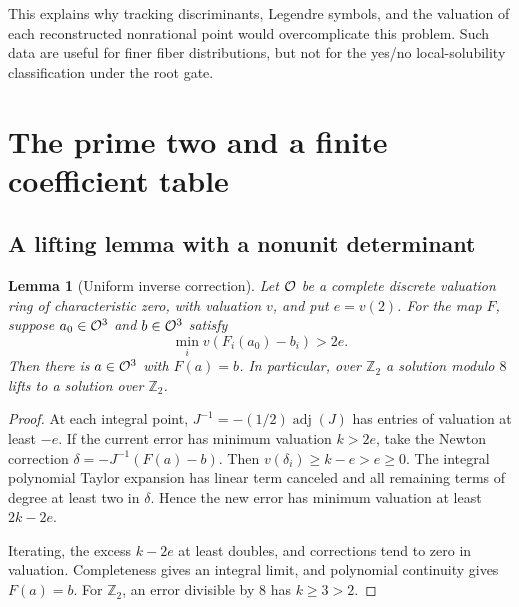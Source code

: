 \documentclass[11pt]{article}
\numberwithin{equation}{section}
\theoremstyle{plain}
\theoremstyle{plain}
\newtheorem{lemma}[lemma]{Lemma}
\theoremstyle{plain}
\theoremstyle{definition}
\theoremstyle{definition}
\theoremstyle{definition}
\theoremstyle{remark}
\newcommand{\Z}{\mathbb Z}\newcommand{\Q}{\mathbb Q}
\begin{document}
This explains why tracking discriminants, Legendre symbols, and the
valuation of each reconstructed nonrational point would overcomplicate
this problem. Such data are useful for finer fiber distributions, but
not for the yes/no local-solubility classification under the root gate.

\section{The prime two and a finite coefficient table}\label{alg:ns:sec:two}

\subsection{A lifting lemma with a nonunit determinant}
\begin{lemma}[Uniform inverse correction]\label{alg:ns:lem:lift}
Let $\mathcal O$ be a complete discrete valuation ring of characteristic zero,
with valuation $v$, and put $e=v(2)$. For the map $F$, suppose
$a_0\in\mathcal O^3$ and $b\in\mathcal O^3$ satisfy
\[
\min_i v(F_i(a_0)-b_i)>2e.
\]
Then there is $a\in\mathcal O^3$ with $F(a)=b$. In particular, over $\Z_2$
a solution modulo $8$ lifts to a solution over $\Z_2$.
\end{lemma}
\begin{proof}
At each integral point, $J^{-1}=-(1/2)\operatorname{adj}(J)$ has entries
of valuation at least $-e$. If the current error has minimum valuation
$k>2e$, take the Newton correction
$\delta=-J^{-1}(F(a)-b)$. Then $v(\delta_i)\ge k-e>e\ge0$.
The integral polynomial Taylor expansion has linear term canceled and
all remaining terms of degree at least two in $\delta$. Hence the new
error has minimum valuation at least $2k-2e$.

Iterating, the excess $k-2e$ at least doubles, and corrections tend to
zero in valuation. Completeness gives an integral limit, and polynomial
continuity gives $F(a)=b$. For $\Z_2$, an error divisible by $8$ has
$k\ge3>2$.
\end{proof}
\end{document}
